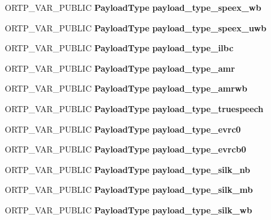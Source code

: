 \begin{DoxyCompactItemize}
\item 
\mbox{\label{payloadtype_8h_a9c8445503b9a72a6ac494eb7fd7fd5b4}} 
O\+R\+T\+P\+\_\+\+V\+A\+R\+\_\+\+P\+U\+B\+L\+IC \textbf{ Payload\+Type} {\bfseries payload\+\_\+type\+\_\+speex\+\_\+wb}
\item 
\mbox{\label{payloadtype_8h_ac86993c8375696f744ee424c7f7ba295}} 
O\+R\+T\+P\+\_\+\+V\+A\+R\+\_\+\+P\+U\+B\+L\+IC \textbf{ Payload\+Type} {\bfseries payload\+\_\+type\+\_\+speex\+\_\+uwb}
\item 
\mbox{\label{payloadtype_8h_a18c9d97bc40d50674a93cc1e7ab34205}} 
O\+R\+T\+P\+\_\+\+V\+A\+R\+\_\+\+P\+U\+B\+L\+IC \textbf{ Payload\+Type} {\bfseries payload\+\_\+type\+\_\+ilbc}
\item 
\mbox{\label{payloadtype_8h_ae0a360917645dc9654e82e3fe979e01d}} 
O\+R\+T\+P\+\_\+\+V\+A\+R\+\_\+\+P\+U\+B\+L\+IC \textbf{ Payload\+Type} {\bfseries payload\+\_\+type\+\_\+amr}
\item 
\mbox{\label{payloadtype_8h_a46c6329497d764b43a57bde0e4515858}} 
O\+R\+T\+P\+\_\+\+V\+A\+R\+\_\+\+P\+U\+B\+L\+IC \textbf{ Payload\+Type} {\bfseries payload\+\_\+type\+\_\+amrwb}
\item 
\mbox{\label{payloadtype_8h_a5916ddea3016b646cdfa115fd06e182e}} 
O\+R\+T\+P\+\_\+\+V\+A\+R\+\_\+\+P\+U\+B\+L\+IC \textbf{ Payload\+Type} {\bfseries payload\+\_\+type\+\_\+truespeech}
\item 
\mbox{\label{payloadtype_8h_ac1fdd2e0913433b117ad9a90e5564fb1}} 
O\+R\+T\+P\+\_\+\+V\+A\+R\+\_\+\+P\+U\+B\+L\+IC \textbf{ Payload\+Type} {\bfseries payload\+\_\+type\+\_\+evrc0}
\item 
\mbox{\label{payloadtype_8h_a906e8cfca34b9c0544b5e9bdb0f6136f}} 
O\+R\+T\+P\+\_\+\+V\+A\+R\+\_\+\+P\+U\+B\+L\+IC \textbf{ Payload\+Type} {\bfseries payload\+\_\+type\+\_\+evrcb0}
\item 
\mbox{\label{payloadtype_8h_aa0470c1b68ba84d4b67f4258842d6c58}} 
O\+R\+T\+P\+\_\+\+V\+A\+R\+\_\+\+P\+U\+B\+L\+IC \textbf{ Payload\+Type} {\bfseries payload\+\_\+type\+\_\+silk\+\_\+nb}
\item 
\mbox{\label{payloadtype_8h_afaa2a5586ee7b18476daf584a42a3a41}} 
O\+R\+T\+P\+\_\+\+V\+A\+R\+\_\+\+P\+U\+B\+L\+IC \textbf{ Payload\+Type} {\bfseries payload\+\_\+type\+\_\+silk\+\_\+mb}
\item 
\mbox{\label{payloadtype_8h_a92395fa7ebed601a7f1b70d0d33a5969}} 
O\+R\+T\+P\+\_\+\+V\+A\+R\+\_\+\+P\+U\+B\+L\+IC \textbf{ Payload\+Type} {\bfseries payload\+\_\+type\+\_\+silk\+\_\+wb}
\item 
\mbox{\label{payloadtype_8h_afc986d7c3f2501741087370af6fe86c2}} 

\end{DoxyCompactItemize}
